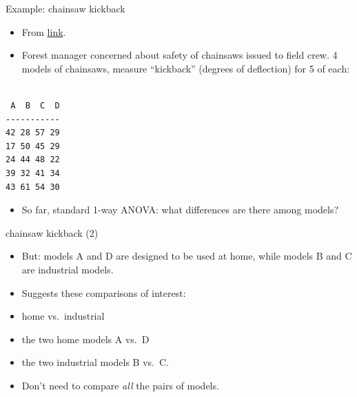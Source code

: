\documentclass[ignorenonframetext,]{beamer}
\providecommand{\tightlist}{%
  \setlength{\itemsep}{0pt}\setlength{\parskip}{0pt}}
\begin{document}
\begin{frame}[fragile]{Example: chainsaw kickback}
\protect\hypertarget{example-chainsaw-kickback}{}

\begin{itemize}
\item
  From
  \href{http://www.ohio.edu/plantbio/staff/mccarthy/quantmet/lectures/ANOVA2.pdf}{link}.
\item
  Forest manager concerned about safety of chainsaws issued to field
  crew. 4 models of chainsaws, measure ``kickback'' (degrees of
  deflection) for 5 of each:
\end{itemize}

\begin{verbatim}

 A  B  C  D
-----------
42 28 57 29
17 50 45 29
24 44 48 22
39 32 41 34
43 61 54 30
\end{verbatim}

\begin{itemize}
\tightlist
\item
  So far, standard 1-way ANOVA: what differences are there among models?
\end{itemize}

\end{frame}

\begin{frame}{chainsaw kickback (2)}
\protect\hypertarget{chainsaw-kickback-2}{}

\begin{itemize}
\item
  But: models A and D are designed to be used at home, while models B
  and C are industrial models.
\item
  Suggests these comparisons of interest:
\item
  home vs.~industrial
\item
  the two home models A vs.~D
\item
  the two industrial models B vs.~C.
\item
  Don't need to compare \emph{all} the pairs of models.
\end{itemize}

\end{frame}
\end{document}
